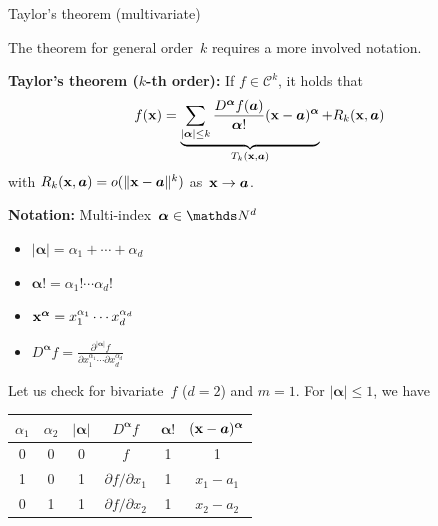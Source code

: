 \documentclass[11pt,compress,t,notes=noshow, xcolor=table]{beamer}
\begin{document}
\begin{vbframe}{Taylor's theorem (multivariate)}

The theorem for general order~$k$ requires a more involved notation.

\begin{kframe}
    \textbf{Taylor's theorem ($k$-th order):} If $f \in \mathcal{C}^k$, it holds that
    \begin{equation*}
        f(\mathbf{x}) = \underbrace{\sum_{|\bm{\alpha}| \le k} \frac{D^{\bm{\alpha}} f(\bm{a})}{{\bm{\alpha}}!} (\mathbf{x} - \bm{a})^{\bm{\alpha}}}_{T_k(\mathbf{x}, \bm{a})} + R_k(\mathbf{x}, \bm{a})
    \end{equation*}
    with $R_k(\mathbf{x}, \bm{a}) = {o}(\|\mathbf{x}-\bm{a}\|^k)$ as~$\mathbf{x} \to \bm{a}$.
\end{kframe}

\textbf{Notation:} Multi-index~$\bm{\alpha} \in \N^d$

\begin{minipage}[t]{0.49\linewidth}
    \begin{itemize}
        \item $|\bm{\alpha}| = \alpha_1 + \cdots + \alpha_d$
        \item $\bm{\alpha}! = \alpha_1! \cdots \alpha_d!$
    \end{itemize}
\end{minipage}
\begin{minipage}[t]{0.49\linewidth}
    \begin{itemize}
        \item $\mathbf{x}^{\bm{\alpha}} = x_1^{\alpha_1} \cdots x_d^{\alpha_d}$
        \item $D^{\bm{\alpha}} f = \frac{\partial^{|\bm{\alpha}|} f}{\partial x_1^{\alpha_1} \cdots \partial x_d^{\alpha_d}}$ 
    \end{itemize}
\end{minipage}

\framebreak 

Let us check for bivariate~$f$ ($d=2$) and $m=1$.
For $|\bm{\alpha}| \le 1$, we have

\begin{table}
    \centering
    \begin{tabular}{c|c||c|c|c|c}
        $\alpha_1$ & $\alpha_2$ & $|\bm{\alpha}|$ & $D^{\bm{\alpha}} f$ & $\bm{\alpha}!$ & $(\mathbf{x}-\bm{a})^{\bm{\alpha}}$ \\ \hline\hline
        0 & 0 & 0 & $f$                         & 1 & 1          \\ \hline
        1 & 0 & 1 & $\partial f / \partial x_1$ & 1 & $x_1-a_1$  \\ \hline
        0 & 1 & 1 & $\partial f / \partial x_2$ & 1 & $x_2-a_2$
    \end{tabular}
\end{table}


\end{vbframe}
\end{document}

